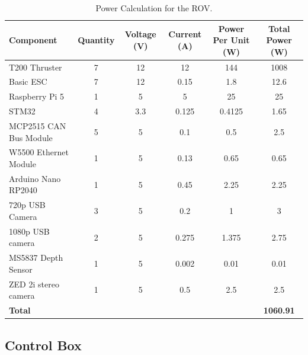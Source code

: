 \documentclass[11pt, twocolumn]{article}
\begin{document}
\begin{table}[b]
    \centering
    \begin{adjustbox}{max width=\textwidth}
    \begin{tabular}{@{} l *{5}{c} @{}}
      \toprule
      \textbf{Component} & \textbf{Quantity} & \textbf{Voltage (V)} & \textbf{Current (A)} & \textbf{Power Per Unit (W)} & \textbf{Total Power (W)} \\
      \midrule
      T200 Thruster            & 7 & 12   & 12     & 144    & 1008   \\
      Basic ESC                & 7 & 12   & 0.15   & 1.8    & 12.6   \\
      Raspberry Pi 5           & 1 & 5    & 5      & 25     & 25     \\
      STM32                    & 4 & 3.3  & 0.125  & 0.4125 & 1.65   \\
      MCP2515 CAN Bus Module   & 5 & 5    & 0.1    & 0.5    & 2.5    \\
      W5500 Ethernet Module    & 1 & 5    & 0.13   & 0.65   & 0.65   \\
      Arduino Nano RP2040      & 1 & 5    & 0.45   & 2.25   & 2.25   \\
      720p USB Camera          & 3 & 5    & 0.2    & 1      & 3      \\
      1080p USB camera         & 2 & 5    & 0.275  & 1.375  & 2.75   \\
      MS5837 Depth Sensor      & 1 & 5    & 0.002  & 0.01   & 0.01   \\
      ZED 2i stereo camera     & 1 & 5    & 0.5    & 2.5    & 2.5    \\
      \midrule
     \multicolumn{5}{l}{\textbf{Total}} & \textbf{1060.91} \\
      \bottomrule
    \end{tabular}
    \end{adjustbox}
\caption{Power Calculation for the ROV.}
\label{tab:rov_power_calculation}
\end{table}

\subsection{Control Box}
\end{document}
